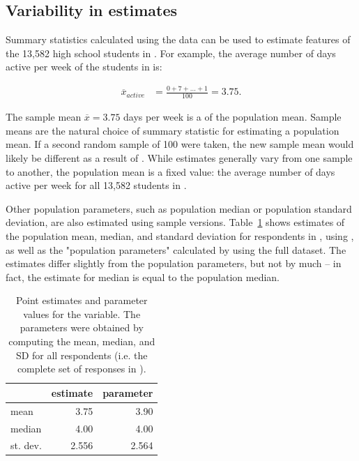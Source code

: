 \begin{spacing}{1.5}
\newpage

\section[Variability in estimates]{Variability in estimates} %
\label{variabilityInEstimates}


Summary statistics calculated using the  data can be used to estimate features of the 13,582 high school students in . For example, the average number of days active per week of the students in  is:

\begin{align*}
\overline{x}_{active} &= \frac{0 + 7 + \dots + 1}{100} = 3.75.
\end{align*}

The sample mean $\overline{x} = 3.75$ days per week is a  of the population mean. Sample means are the natural choice of summary statistic for estimating a population mean. If a second random sample of 100 were taken, the new sample mean would likely be different as a result of . While estimates generally vary from one sample to another, the population mean is a fixed value: the average number of days active per week for all 13,582 students in .

Other population parameters, such as population median or population standard deviation, are also estimated using sample versions. Table~\ref{ptEstimatesYrbssActive} shows estimates of the population mean, median, and standard deviation for respondents in , using , as well as the "population parameters" calculated by using the full  dataset. The estimates differ slightly from the population parameters, but not by much -- in fact, the estimate for median is equal to the population median.

\begin{table}[h]
	\centering
	\begin{tabular}{ l rr}
		\hline
		\var{active}	& estimate & parameter  \\
		\hline
		mean		& 3.75 & 3.90 \\
		median		& 4.00 & 4.00 \\
		st. dev.		& 2.556 & 2.564 \\
		\hline
	\end{tabular}
	\caption{Point estimates and parameter values for the  variable. The parameters were obtained by computing the mean, median, and SD for all respondents (i.e. the complete set of responses in ).}
	\label{ptEstimatesYrbssActive}
\end{table}


\end{spacing}
